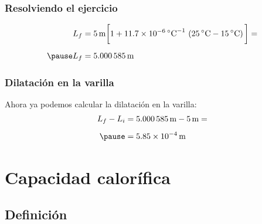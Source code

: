 \documentclass[14pt]{beamer}
\begin{document}
\begin{frame}
\frametitle{Resolviendo el ejercicio}
\begin{eqnarray*}
\begin{aligned}
L_{f} &= \SI{5}{\meter} \bigg[ 1 + \num{11.7d-6} \, \unit{\degreeCelsius}^{-1} \, \left( \SI{25}{\degreeCelsius} - \SI{15}{\degreeCelsius} \right) \bigg] = \\[0.5em] \pause
L_{f} &= \SI{5.000585}{\meter}
\end{aligned}
\end{eqnarray*}
\end{frame}
\begin{frame}
\frametitle{Dilatación en la varilla}
Ahora ya podemos calcular la dilatación en la varilla:
\pause
\begin{eqnarray*}
\begin{aligned}
L_{f} - L_{i} &= \SI{5.000585}{\meter} - \SI{5}{\meter} = \\[0.5em] \pause
&= \SI{5.85d-4}{\meter}
\end{aligned}
\end{eqnarray*}
\end{frame}

\section{Capacidad calorífica}
\subsection{Definición}
\end{document}
